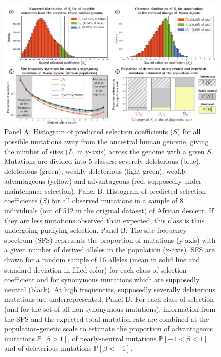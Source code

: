 \documentclass{article}
\newcommand{\proba}{\mathbb{P}}
\newcommand{\Sphy}{S}
\newcommand{\Spop}{\beta}
\newcommand{\polyDel}{\Spop < -1}
\newcommand{\polyNeutral}{-1 < \Spop < 1}
\newcommand{\polyAdv}{ \Spop > 1}
\newcommand{\PpolyDel}{\proba \left[ \polyDel \right]}
\newcommand{\PpolyNeutral}{\proba \left[ \polyNeutral \right]}
\newcommand{\PpolyAdv}{\proba \left[ \polyAdv \right]}
\begin{document}
    \begin{figure}[!ht]
        \centering
        \includegraphics[width=\textwidth, page=1] {artworks/figure.homo-afr-results}
        \caption{
            Panel A: Histogram of predicted selection coefficients ($\Sphy$) for all possible mutations away from the ancestral human genome, giving the number of sites ($L$, in y-axis) across the genome with a given $\Sphy$.
            Mutations are divided into 5 classes: severely deleterious (blue), deleterious (green), weakly deleterious (light green), weakly advantageous (yellow) and advantageous (red, supposedly under maintenance selection).
            Panel B. Histogram of predicted selection coefficients ($\Sphy$) for all observed mutations in a sample of 8 individuals (out of 512 in the original dataset) of African descent.
            If they are less mutations observed than expected, this class is thus undergoing purifying selection.
            Panel B: The site-frequency spectrum (SFS) represents the proportion of mutations (y-axis) with a given number of derived alleles in the population (x-axis).
            SFS are drawn for a random sample of 16 alleles (mean in solid line and standard deviation in filled color) for each class of selection coefficient and for synonymous mutations which are supposedly neutral (black).
            At high frequencies, supposedly severally deleterious mutations are underrepresented.
            Panel D. For each class of selection (and for the set of all non-synonymous mutations), information from the SFS and the expected total mutation rate are combined at the population-genetic scale to estimate the proportion of advantageous mutations $\PpolyAdv$, of nearly-neutral mutations $\PpolyNeutral$ and of deleterious mutations $\PpolyDel$.
        }
        \label{fig:homo-afr-results}
    \end{figure}
\end{document}
